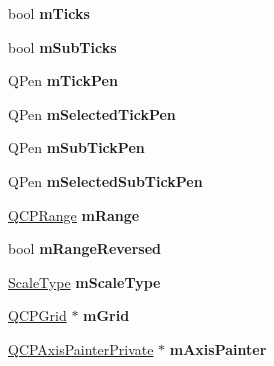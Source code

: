 \begin{DoxyCompactItemize}
\item 
bool {\bfseries m\+Ticks}\hypertarget{classQCPAxis_ab111e74bba22e06848897c932fc549fe}{}\label{classQCPAxis_ab111e74bba22e06848897c932fc549fe}

\item 
bool {\bfseries m\+Sub\+Ticks}\hypertarget{classQCPAxis_af16aab9c3effa482fa10e7dd5c3d91f3}{}\label{classQCPAxis_af16aab9c3effa482fa10e7dd5c3d91f3}

\item 
Q\+Pen {\bfseries m\+Tick\+Pen}\hypertarget{classQCPAxis_a1d52c78c856d8bd1f331d4ec4e63d944}{}\label{classQCPAxis_a1d52c78c856d8bd1f331d4ec4e63d944}

\item 
Q\+Pen {\bfseries m\+Selected\+Tick\+Pen}\hypertarget{classQCPAxis_a9524593dbc75a5c5b29dbd1cb4b37df5}{}\label{classQCPAxis_a9524593dbc75a5c5b29dbd1cb4b37df5}

\item 
Q\+Pen {\bfseries m\+Sub\+Tick\+Pen}\hypertarget{classQCPAxis_a32ef56d3a417866720eb12667d27dbd1}{}\label{classQCPAxis_a32ef56d3a417866720eb12667d27dbd1}

\item 
Q\+Pen {\bfseries m\+Selected\+Sub\+Tick\+Pen}\hypertarget{classQCPAxis_aa5cc6afc5dc2a365f5abbd36eb04a1dc}{}\label{classQCPAxis_aa5cc6afc5dc2a365f5abbd36eb04a1dc}

\item 
\hyperlink{classQCPRange}{Q\+C\+P\+Range} {\bfseries m\+Range}\hypertarget{classQCPAxis_a1ee36773c49062d751560e11f90845f7}{}\label{classQCPAxis_a1ee36773c49062d751560e11f90845f7}

\item 
bool {\bfseries m\+Range\+Reversed}\hypertarget{classQCPAxis_a5cb034f57aa3d773a9ca55a0931dbf7b}{}\label{classQCPAxis_a5cb034f57aa3d773a9ca55a0931dbf7b}

\item 
\hyperlink{classQCPAxis_a36d8e8658dbaa179bf2aeb973db2d6f0}{Scale\+Type} {\bfseries m\+Scale\+Type}\hypertarget{classQCPAxis_ad706039549cbbbec5fcb2baf7894e04d}{}\label{classQCPAxis_ad706039549cbbbec5fcb2baf7894e04d}

\item 
\hyperlink{classQCPGrid}{Q\+C\+P\+Grid} $\ast$ {\bfseries m\+Grid}\hypertarget{classQCPAxis_a17bffb94aaa40311f259c6ac7bcb5d5f}{}\label{classQCPAxis_a17bffb94aaa40311f259c6ac7bcb5d5f}

\item 
\hyperlink{classQCPAxisPainterPrivate}{Q\+C\+P\+Axis\+Painter\+Private} $\ast$ {\bfseries m\+Axis\+Painter}\hypertarget{classQCPAxis_aeeae00935bd2dab82d64f32544a90913}{}\label{classQCPAxis_aeeae00935bd2dab82d64f32544a90913}


\end{DoxyCompactItemize}

